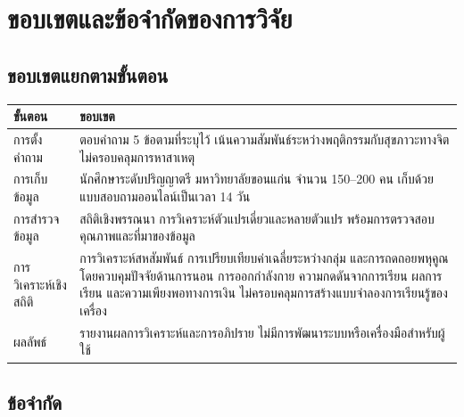 \section{ขอบเขตและข้อจำกัดของการวิจัย}


\subsection{ขอบเขตแยกตามขั้นตอน}

\begin{table}[H]
\centering
\begin{tabularx}{\textwidth}{|l|L|}
\hline
\textbf{ขั้นตอน} & \textbf{ขอบเขต} \\
\hline
การตั้งคำถาม & ตอบคำถาม 5 ข้อตามที่ระบุไว้ เน้นความสัมพันธ์ระหว่างพฤติกรรมกับสุขภาวะทางจิต ไม่ครอบคลุมการหาสาเหตุ \\
\hline
การเก็บข้อมูล & นักศึกษาระดับปริญญาตรี มหาวิทยาลัยขอนแก่น จำนวน 150--200 คน เก็บด้วยแบบสอบถามออนไลน์เป็นเวลา 14 วัน \\
\hline
การสำรวจข้อมูล & สถิติเชิงพรรณนา การวิเคราะห์ตัวแปรเดี่ยวและหลายตัวแปร พร้อมการตรวจสอบคุณภาพและที่มาของข้อมูล \\
\hline
การวิเคราะห์เชิงสถิติ & การวิเคราะห์สหสัมพันธ์ การเปรียบเทียบค่าเฉลี่ยระหว่างกลุ่ม และการถดถอยพหุคูณโดยควบคุมปัจจัยด้านการนอน การออกกำลังกาย ความกดดันจากการเรียน ผลการเรียน และความเพียงพอทางการเงิน ไม่ครอบคลุมการสร้างแบบจำลองการเรียนรู้ของเครื่อง \\
\hline
ผลลัพธ์ & รายงานผลการวิเคราะห์และการอภิปราย ไม่มีการพัฒนาระบบหรือเครื่องมือสำหรับผู้ใช้ \\
\hline
\end{tabularx}
\end{table}

\subsection{ข้อจำกัด}


